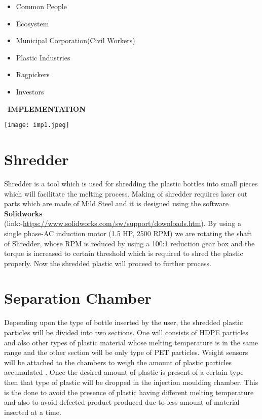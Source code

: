 \documentclass{article}
\begin{document}
\begin{itemize}
\Large
    \item Common People
\item Ecosystem
\item Municipal Corporation(Civil Workers)
\item Plastic Industries
\item Ragpickers
\item Investors
\end{itemize}

\newpage

\begin{flushleft}
    \ \LARGE{\textsc {\textbf{IMPLEMENTATION}}}\\
\end{flushleft}
\vspace{0.5cm}
\texttt{[image: imp1.jpeg]}
\newpage
\section{Shredder}
\Large
Shredder is a tool which is used for shredding the plastic bottles into small pieces which will facilitate the melting process.
Making of shredder requires laser cut parts which are made of Mild Steel and it is designed using the software \textbf{Solidworks}\\(link:-\href{https://www.solidworks.com/sw/support/downloads.htm}{https://www.solidworks.com/sw/support/downloads.htm}). By using a single phase-AC induction motor (1.5 HP, 2500 RPM) we are rotating the shaft of Shredder, whose RPM is reduced by using a 100:1 reduction gear box and the torque is increased to certain threshold which is required to shred the plastic properly.
Now the shredded plastic will proceed to further process. 
\newline
\section{Separation Chamber}
\Large
Depending upon the type of bottle inserted by the user, the shredded plastic particles will be divided into two sections. One will consists of HDPE particles and also other types of plastic material whose melting temperature is in the same range and the other section will be only type of PET particles. Weight sensors will be attached to the chambers
to weigh the amount of plastic particles accumulated . Once the desired amount of plastic is present of a certain type then that type of plastic will be dropped in the injection moulding chamber. This is the done to avoid the presence of plastic having different melting temperature and also to avoid defected product produced due to less amount of material inserted at a time.  
 \newline
\end{document}
